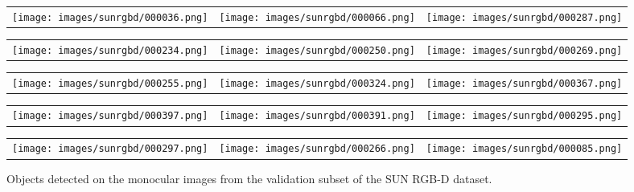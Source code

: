 \documentclass[10pt,twocolumn,letterpaper]{article}
\begin{document}
\newpage

\begin{figure*}[!ht]
\centering
\setlength{\tabcolsep}{2pt}
\renewcommand{\arraystretch}{0.75}
\begin{tabular}{ccc}
    \texttt{[image: images/sunrgbd/000036.png]} &
    \texttt{[image: images/sunrgbd/000066.png]} &
    \texttt{[image: images/sunrgbd/000287.png]} \\
\end{tabular}
\begin{tabular}{ccc}
    \texttt{[image: images/sunrgbd/000234.png]} &
    \texttt{[image: images/sunrgbd/000250.png]} &
    \texttt{[image: images/sunrgbd/000269.png]} \\
\end{tabular}
\begin{tabular}{ccc}
    \texttt{[image: images/sunrgbd/000255.png]} &
    \texttt{[image: images/sunrgbd/000324.png]} &
    \texttt{[image: images/sunrgbd/000367.png]} \\
\end{tabular}
\begin{tabular}{ccc}
    \texttt{[image: images/sunrgbd/000397.png]} &
    \texttt{[image: images/sunrgbd/000391.png]} &
    \texttt{[image: images/sunrgbd/000295.png]} \\
\end{tabular}
\begin{tabular}{ccc}
    \texttt{[image: images/sunrgbd/000297.png]} &
    \texttt{[image: images/sunrgbd/000266.png]} &
    \texttt{[image: images/sunrgbd/000085.png]} \\
\end{tabular}
\caption{Objects detected on the monocular images from the validation subset of the SUN RGB-D dataset.}
\label{fig:vis_sunrgbd}
\end{figure*}
\end{document}
